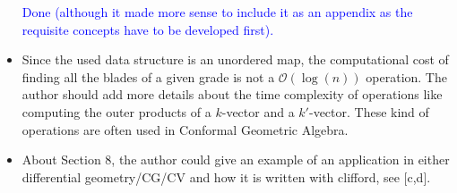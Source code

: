 \documentclass{article}
\begin{document}
\begin{itemize}
\textcolor{blue}{Done (although it made more sense to include it as an
  appendix as the requisite concepts have to be developed first).}
  
\item Since the used data structure is an unordered map, the
  computational cost of finding all the blades of a given grade is not
  a $\mathcal{O}(\log(n))$ operation.  The author should add more
  details about the time complexity of operations like computing the
  outer products of a $k$-vector and a $k'$-vector.  These kind of
  operations are often used in Conformal Geometric Algebra.

\item About Section 8, the author could give an example of an
  application in either differential geometry/CG/CV and how it is
  written with clifford, see [c,d].

\end{itemize}
\end{document}
